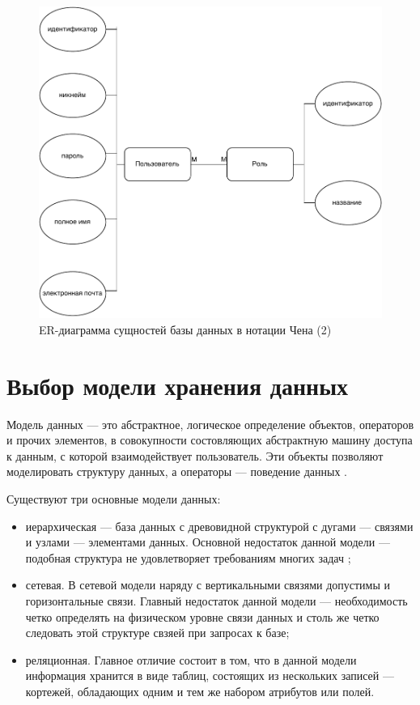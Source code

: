 \begin{figure}[h!]
	\begin{center}
		\includegraphics[scale=0.8]{img/er2.pdf}
	\end{center}
	\captionsetup{justification=centering}
	\caption{ER-диаграмма сущностей базы данных в нотации Чена (2)}
	\label{img:er2}
\end{figure}



\section{Выбор модели хранения данных}

Модель данных --- это абстрактное, логическое определение объектов, операторов и прочих элементов, в совокупности состовляющих абстрактную машину доступа к данным, с которой взаимодействует пользователь. Эти объекты позволяют моделировать структуру данных, а операторы --- поведение данных \cite{bib:1}.  

Существуют три основные модели данных:

\begin{itemize}
	\item иерархическая --- база данных с древовидной структурой с дугами --- связями и узлами --- элементами данных. Основной недостаток данной модели --- подобная структура не удовлетворяет требованиям многих задач \cite{bib:2};
 	\item сетевая. В сетевой модели наряду с вертикальными связями допустимы и горизонтальные связи. Главный недостаток данной модели --- необходимость четко определять на физическом уровне связи данных и столь же четко следовать этой структуре свзяей при запросах к базе;
  	\item реляционная. Главное отличие состоит в том, что в данной модели информация хранится в виде таблиц, состоящих из нескольких записей --- кортежей, обладающих одним и тем же набором атрибутов или полей.  
\end{itemize}

